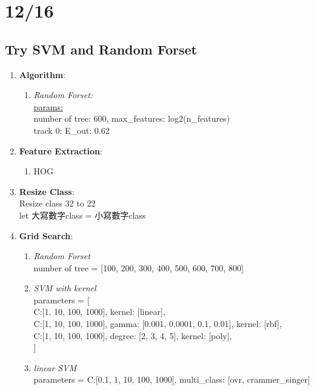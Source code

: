\documentclass[12pt]{article}
\theoremstyle{definition}
\theoremstyle{remark}
\begin{document}
\section{12/16}
\subsection{Try SVM and Random Forset}
\begin{enumerate}
  \item \textbf{Algorithm}:
      \begin{enumerate}
          \item {\em Random Forset:\/} \\
            \underline{params:} \\
            number of tree: 600, max\_features: log2(n\_features)\\
            {\color{red}track 0: E\_out: 0.62}
      \end{enumerate}
    \item \textbf{Feature Extraction}:
      \begin{enumerate}
        \item HOG
      \end{enumerate}
    \item \textbf{Resize Class}:\\
      Resize class 32 to 22\\
      let 大寫數字class =  小寫數字class
    \item \textbf{Grid Search}:
      \begin{enumerate}
        \item {\em Random Forset\/} \\
          number of tree = [100, 200, 300, 400, 500, 600, 700, 800]
        \item {\em SVM with kernel\/}\\
        parameters = [ \\
          {C:[1, 10, 100, 1000], kernel: [linear]},\\
          {C:[1, 10, 100, 1000], gamma: [0.001, 0.0001, 0.1, 0.01], kernel: [rbf]},\\
          {C:[1, 10, 100, 1000], degree: [2, 3, 4, 5], kernel: [poly]}, \\
        ]
        \item {\em linear SVM\/}\\
        parameters = {C:[0.1, 1, 10, 100, 1000], multi\_class: [ovr, crammer\_singer]}
      \end{enumerate}
\end{enumerate}
\end{document}
